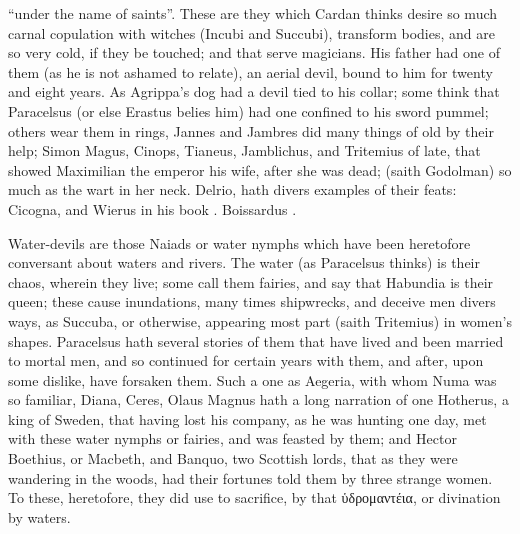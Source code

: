 \enquote{under the name of saints}. These are they which Cardan thinks desire so much
carnal copulation with witches (Incubi and Succubi), transform bodies, and are
so very cold, if they be touched; and that serve magicians. His father had one
of them (as he is not ashamed to relate), an aerial devil,
bound to him for twenty and eight years. As Agrippa's dog had a devil tied to
his collar; some think that Paracelsus (or else Erastus belies him) had one
confined to his sword pummel; others wear them in rings, \etc{} Jannes and
Jambres did many things of old by their help; Simon Magus, Cinops, \Apollonius{}
Tianeus, Jamblichus, and Tritemius of late, that showed Maximilian the emperor
his wife, after she was dead;  (saith
Godolman) so much as the wart in her neck. Delrio,
 hath divers examples of their feats: Cicogna,
 and Wierus in his book
. Boissardus
.

Water-devils are those Naiads or water nymphs which have been heretofore
conversant about waters and rivers. The water (as Paracelsus thinks) is their
chaos, wherein they live; some call them fairies, and say that Habundia is
their queen; these cause inundations, many times shipwrecks, and deceive men
divers ways, as Succuba, or otherwise, appearing most part (saith Tritemius) in
women's shapes. Paracelsus hath several stories of them
that have lived and been married to mortal men, and so continued for certain
years with them, and after, upon some dislike, have forsaken them. Such a one
as Aegeria, with whom Numa was so familiar, Diana, Ceres, \etc{}
Olaus Magnus hath a long narration of one Hotherus, a king
of Sweden, that having lost his company, as he was hunting one day, met with
these water nymphs or fairies, and was feasted by them; and Hector Boethius, or
Macbeth, and Banquo, two Scottish lords, that as they were wandering in the
woods, had their fortunes told them by three strange women. To these,
heretofore, they did use to sacrifice, by that \textgreek{ὑδρομαντέια}, or
divination by waters.

